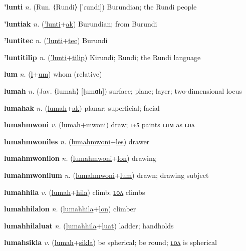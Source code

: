 \textbf{\hypertarget{'lunti}{'lunti}} \textit{n.} (Run. ⟨Rundi⟩ [ˈɾundi])
Burundian; the Rundi people

\textbf{\hypertarget{'luntiak}{'luntiak}} \textit{n.} (\hyperlink{'lunti}{'lunti}+\allowbreak \hyperlink{ak}{ak})
Burundian; from Burundi

\textbf{\hypertarget{'luntitec}{'luntitec}} \textit{n.} (\hyperlink{'lunti}{'lunti}+\allowbreak \hyperlink{tec}{tec})
Burundi

\textbf{\hypertarget{'luntitilip}{'luntitilip}} \textit{n.} (\hyperlink{'lunti}{'lunti}+\allowbreak \hyperlink{tilip}{tilip})
Kirundi; Rundi; the Rundi language

\textbf{\hypertarget{lum}{lum}} \textit{n.} (\hyperlink{l}{l}+\allowbreak \hyperlink{um}{um})
whom (relative)

\textbf{\hypertarget{lumah}{lumah}} \textit{n.} (Jav. ⟨lumah⟩ [ɭumɑh])
surface; plane; layer; two-dimensional locus

\textbf{\hypertarget{lumahak}{lumahak}} \textit{n.} (\hyperlink{lumah}{lumah}+\allowbreak \hyperlink{ak}{ak})
planar; superficial; facial

\textbf{\hypertarget{lumahmwoni}{lumahmwoni}} \textit{v.} (\hyperlink{lumah}{lumah}+\allowbreak \hyperlink{mwoni}{mwoni})
draw; \hyperlink{lumahmwoniles}{ʟєꜱ} paints \hyperlink{lumahmwonilum}{ʟᴜᴍ} as \hyperlink{lumahmwonilon}{ʟᴏᴧ}

\textbf{\hypertarget{lumahmwoniles}{lumahmwoniles}} \textit{n.} (\hyperlink{lumahmwoni}{lumahmwoni}+\allowbreak \hyperlink{les}{les})
drawer

\textbf{\hypertarget{lumahmwonilon}{lumahmwonilon}} \textit{n.} (\hyperlink{lumahmwoni}{lumahmwoni}+\allowbreak \hyperlink{lon}{lon})
drawing

\textbf{\hypertarget{lumahmwonilum}{lumahmwonilum}} \textit{n.} (\hyperlink{lumahmwoni}{lumahmwoni}+\allowbreak \hyperlink{lum}{lum})
drawn; drawing subject

\textbf{\hypertarget{lumahhila}{lumahhila}} \textit{v.} (\hyperlink{lumah}{lumah}+\allowbreak \hyperlink{hila}{hila})
climb; \hyperlink{lumahhilalon}{ʟᴏᴧ} climbs

\textbf{\hypertarget{lumahhilalon}{lumahhilalon}} \textit{n.} (\hyperlink{lumahhila}{lumahhila}+\allowbreak \hyperlink{lon}{lon})
climber

\textbf{\hypertarget{lumahhilaluat}{lumahhilaluat}} \textit{n.} (\hyperlink{lumahhila}{lumahhila}+\allowbreak \hyperlink{luat}{luat})
ladder; handholds

\textbf{\hypertarget{lumahsikla}{lumahsikla}} \textit{v.} (\hyperlink{lumah}{lumah}+\allowbreak \hyperlink{sikla}{sikla})
be spherical; be round; \hyperlink{lumahsiklalon}{ʟᴏᴧ} is spherical

